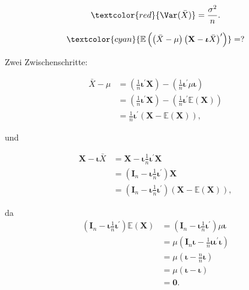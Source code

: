 \documentclass{tstextbook}
\begin{document}
\begin{example}
\[
\textcolor{red}{\Var(\bar{X})}=\frac{\sigma^{2}}{n}.
\]



\[
\textcolor{cyan}{\mathbb{E}\left(\left(\bar{X}-\mu\right)\left(\textbf{X}-\boldsymbol{\iota}\bar{X}\right)^{\prime}\right)}=?
\]

Zwei Zwischenschritte:

\begin{align*}
	\bar{X}-\mu & =\left(\frac{1}{n}\boldsymbol{\iota}^{\prime}\textbf{X}\right)-\left(\frac{1}{n}\boldsymbol{\iota}^{\prime}\mu\boldsymbol{\iota}\right)\\
	& =\left(\frac{1}{n}\boldsymbol{\iota}^{\prime}\textbf{X}\right)-\left(\frac{1}{n}\boldsymbol{\iota}^{\prime}\mathbb{E}(\textbf{X})\right)\\
	& =\frac{1}{n}\boldsymbol{\iota}^{\prime}\left(\textbf{X}-\mathbb{E}(\textbf{X})\right),
\end{align*}

und

\begin{align*}
	\textbf{X}-\boldsymbol{\iota}\bar{X} & =\textbf{X}-\boldsymbol{\iota}\frac{1}{n}\boldsymbol{\iota}^{\prime}\textbf{X}\\
	& =\left(\textbf{I}_{n}-\boldsymbol{\iota}\frac{1}{n}\boldsymbol{\iota}^{\prime}\right)\textbf{X}\\
	& =\left(\textbf{I}_{n}-\boldsymbol{\iota}\frac{1}{n}\boldsymbol{\iota}^{\prime}\right)\left(\textbf{X}-\mathbb{E}(\textbf{X})\right),
\end{align*}

da
\begin{align*}
	\left(\textbf{I}_{n}-\boldsymbol{\iota}\frac{1}{n}\boldsymbol{\iota}^{\prime}\right)\mathbb{E}(\textbf{X}) & =\left(\textbf{I}_{n}-\boldsymbol{\iota}\frac{1}{n}\boldsymbol{\iota}^{\prime}\right)\mu\boldsymbol{\iota}\\
	& =\mu\left(\textbf{I}_{n}\boldsymbol{\iota}-\frac{1}{n}\boldsymbol{\iota}\boldsymbol{\iota}^{\prime}\boldsymbol{\iota}\right)\\
	& =\mu\left(\boldsymbol{\iota}-\frac{n}{n}\boldsymbol{\iota}\right)\\
	& =\mu\left(\boldsymbol{\iota}-\boldsymbol{\iota}\right)\\
	& =\boldsymbol{0}.
\end{align*}


\end{example}
\end{document}
